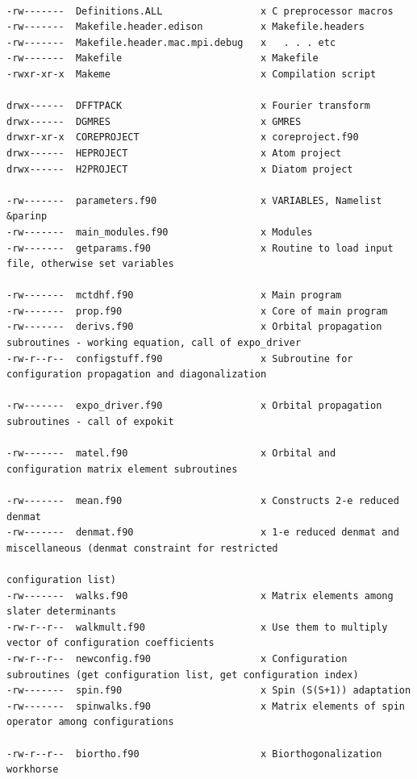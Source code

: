 \documentclass[10pt,leqno, oneside]{book}
\begin{document}
{\footnotesize
\begin{verbatim}

-rw-------  Definitions.ALL                 x C preprocessor macros
-rw-------  Makefile.header.edison          x Makefile.headers
-rw-------  Makefile.header.mac.mpi.debug   x   . . . etc
-rw-------  Makefile                        x Makefile
-rwxr-xr-x  Makeme                          x Compilation script

drwx------  DFFTPACK                        x Fourier transform
drwx------  DGMRES                          x GMRES
drwxr-xr-x  COREPROJECT                     x coreproject.f90
drwx------  HEPROJECT                       x Atom project
drwx------  H2PROJECT                       x Diatom project

-rw-------  parameters.f90                  x VARIABLES, Namelist &parinp
-rw-------  main_modules.f90                x Modules
-rw-------  getparams.f90                   x Routine to load input file, otherwise set variables

-rw-------  mctdhf.f90                      x Main program
-rw-------  prop.f90                        x Core of main program
-rw-------  derivs.f90                      x Orbital propagation subroutines - working equation, call of expo_driver
-rw-r--r--  configstuff.f90                 x Subroutine for configuration propagation and diagonalization

-rw-------  expo_driver.f90                 x Orbital propagation subroutines - call of expokit

-rw-------  matel.f90                       x Orbital and configuration matrix element subroutines

-rw-------  mean.f90                        x Constructs 2-e reduced denmat
-rw-------  denmat.f90                      x 1-e reduced denmat and miscellaneous (denmat constraint for restricted
                                                                             configuration list)
-rw-------  walks.f90                       x Matrix elements among slater determinants
-rw-r--r--  walkmult.f90                    x Use them to multiply vector of configuration coefficients
-rw-r--r--  newconfig.f90                   x Configuration subroutines (get configuration list, get configuration index)
-rw-------  spin.f90                        x Spin (S(S+1)) adaptation
-rw-------  spinwalks.f90                   x Matrix elements of spin operator among configurations

-rw-r--r--  biortho.f90                     x Biorthogonalization workhorse


\end{verbatim}}
\end{document}
